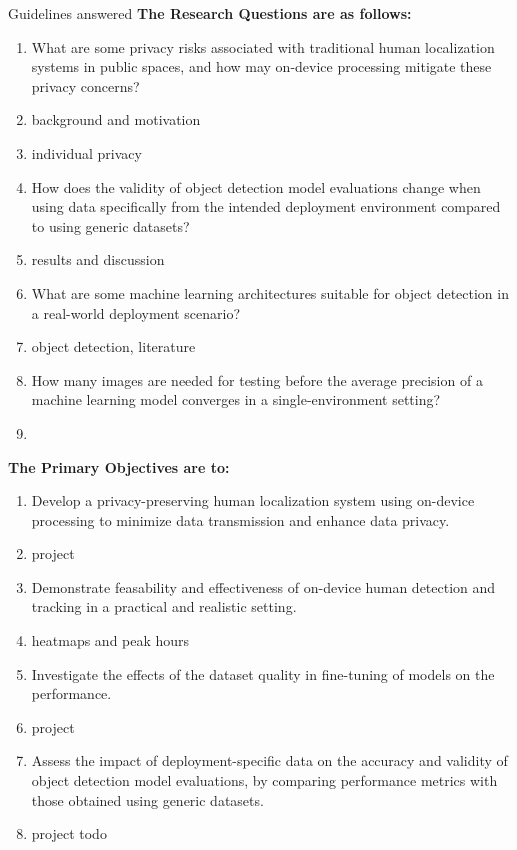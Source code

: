 
Guidelines answered
\textbf{The Research Questions are as follows:}
\begin{enumerate}
	
	\item What are some privacy risks associated with traditional human localization systems in public spaces, and how may on-device processing mitigate these privacy concerns? 
	\item background and motivation
	\item individual privacy
	
	\item How does the validity of object detection model evaluations change when using data specifically from the intended deployment environment compared to using generic datasets?
	\item results and discussion
	
	\item What are some machine learning architectures suitable for object detection in a real-world deployment scenario?
	\item object detection, literature

	\item How many images are needed for testing before the average precision of a machine learning model converges in a single-environment setting?
	\item 
\end{enumerate}

\textbf{The Primary Objectives are to:}
\begin{enumerate}
	
	\item Develop a privacy-preserving human localization system using on-device processing to minimize data transmission and enhance data privacy.
	\item project
	
	\item Demonstrate feasability and effectiveness of on-device human detection and tracking in a practical and realistic setting.
	\item heatmaps and peak hours
	
	\item Investigate the effects of the dataset quality in fine-tuning of models on the performance.
	\item project
	
	\item Assess the impact of deployment-specific data on the accuracy and validity of object detection model evaluations, by comparing performance metrics with those obtained using generic datasets.
	\item project todo
\end{enumerate}

